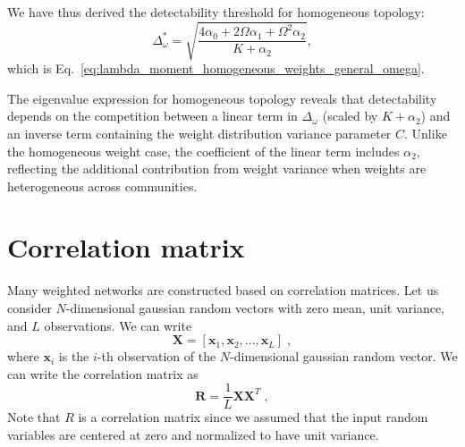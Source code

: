 \documentclass[a4paper,pre,superscriptaddress,floatfix,nofootinbib,twocolumn]{revtex4-1}
\begin{document}
We have thus derived the detectability threshold for homogeneous topology:
\begin{equation}
\boxed{\Delta_\omega^* = \sqrt{\frac{4\alpha_0 + 2\Omega\alpha_1 + \Omega^2\alpha_2}{K + \alpha_2}}},
\end{equation}
which is Eq.~\eqref{eq:lambda_moment_homogeneous_weights_general_omega}.

The eigenvalue expression for homogeneous topology reveals that detectability depends on the competition between a linear term in $\Delta_\omega$ (scaled by $K + \alpha_2$) and an inverse term containing the weight distribution variance parameter $C$. Unlike the homogeneous weight case, the coefficient of the linear term includes $\alpha_2$, reflecting the additional contribution from weight variance when weights are heterogeneous across communities.


\section{Correlation matrix}
\label{sec:correlation_matrix}

Many weighted networks are constructed based on correlation matrices. Let us consider $N$-dimensional gaussian random vectors with zero mean, unit variance, and $L$ observations. We can write
\begin{equation}
\mathbf{X} = \left[ \mathbf{x}_1, \mathbf{x}_2, \ldots, \mathbf{x}_L \right] \; ,
\end{equation}
where $\mathbf{x}_i$ is the $i$-th observation of the $N$-dimensional gaussian random vector. We can write the correlation matrix as
\begin{equation}
    \mathbf{R} = \frac{1}{L} \mathbf{X} \mathbf{X}^T \; ,
\end{equation}
Note that $R$ is a correlation matrix since we assumed that the input random variables are centered at zero and normalized to have unit variance.
\end{document}
